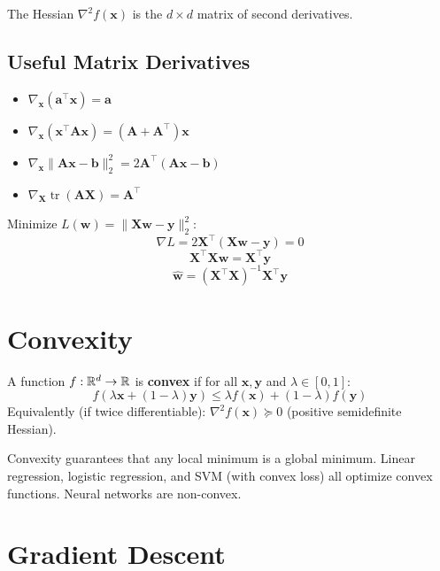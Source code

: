 The Hessian $\nabla^2 f(\mathbf{x})$ is the $d \times d$ matrix of second derivatives.

\subsection{Useful Matrix Derivatives}

\begin{itemize}
	\item $\nabla_{\mathbf{x}} (\mathbf{a}^\top \mathbf{x}) = \mathbf{a}$
	\item $\nabla_{\mathbf{x}} (\mathbf{x}^\top \mathbf{A} \mathbf{x}) = (\mathbf{A} + \mathbf{A}^\top) \mathbf{x}$
	\item $\nabla_{\mathbf{x}} \|\mathbf{A}\mathbf{x} - \mathbf{b}\|_2^2 = 2\mathbf{A}^\top (\mathbf{A}\mathbf{x} - \mathbf{b})$
	\item $\nabla_{\mathbf{X}} \operatorname{tr}(\mathbf{A}\mathbf{X}) = \mathbf{A}^\top$
\end{itemize}

\begin{example}
	Minimize $L(\mathbf{w}) = \|\mathbf{X}\mathbf{w} - \mathbf{y}\|_2^2$:
	\[
		\nabla L = 2\mathbf{X}^\top (\mathbf{X}\mathbf{w} - \mathbf{y}) = 0
	\]
	\[
		\mathbf{X}^\top \mathbf{X} \mathbf{w} = \mathbf{X}^\top \mathbf{y}
	\]
	\[
		\hat{\mathbf{w}} = (\mathbf{X}^\top \mathbf{X})^{-1} \mathbf{X}^\top \mathbf{y}
	\]
\end{example}

\section{Convexity}

\begin{definition}
	A function $f: \mathbb{R}^d \to \mathbb{R}$ is \textbf{convex} if for all $\mathbf{x}, \mathbf{y}$ and $\lambda \in [0,1]$:
	\[
		f(\lambda \mathbf{x} + (1-\lambda) \mathbf{y}) \leq \lambda f(\mathbf{x}) + (1-\lambda) f(\mathbf{y})
	\]
	Equivalently (if twice differentiable): $\nabla^2 f(\mathbf{x}) \succeq 0$ (positive semidefinite Hessian).
\end{definition}

Convexity guarantees that any local minimum is a global minimum. Linear regression, logistic regression, and SVM (with convex loss) all optimize convex functions. Neural networks are non-convex.

\section{Gradient Descent}

